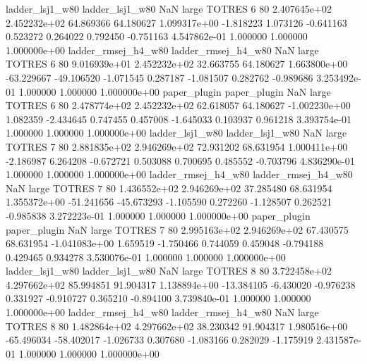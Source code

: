     ladder_lsj1_w80     ladder_lsj1_w80                   NaN      large   TOTRES                 6 80 2.407645e+02   2.452232e+02     64.869366      64.180627  1.099317e+00     -1.818223      1.073126    -0.641163       0.523272  0.264022   0.792450    -0.751163   4.547862e-01            1.000000        1.000000        1.000000e+00
ladder_rmsej_h4_w80 ladder_rmsej_h4_w80                   NaN      large   TOTRES                 6 80 9.016939e+01   2.452232e+02     32.663755      64.180627  1.663800e+00    -63.229667    -49.106520    -1.071545       0.287187 -1.081507   0.282762    -0.989686   3.253492e-01            1.000000        1.000000        1.000000e+00
       paper_plugin        paper_plugin                   NaN      large   TOTRES                 6 80 2.478774e+02   2.452232e+02     62.618057      64.180627 -1.002230e+00      1.082359     -2.434645     0.747455       0.457008 -1.645033   0.103937     0.961218   3.393754e-01            1.000000        1.000000        1.000000e+00
    ladder_lsj1_w80     ladder_lsj1_w80                   NaN      large   TOTRES                 7 80 2.881835e+02   2.946269e+02     72.931202      68.631954  1.000411e+00     -2.186987      6.264208    -0.672721       0.503088  0.700695   0.485552    -0.703796   4.836290e-01            1.000000        1.000000        1.000000e+00
ladder_rmsej_h4_w80 ladder_rmsej_h4_w80                   NaN      large   TOTRES                 7 80 1.436552e+02   2.946269e+02     37.285480      68.631954  1.355372e+00    -51.241656    -45.673293    -1.105590       0.272260 -1.128507   0.262521    -0.985838   3.272223e-01            1.000000        1.000000        1.000000e+00
       paper_plugin        paper_plugin                   NaN      large   TOTRES                 7 80 2.995163e+02   2.946269e+02     67.430575      68.631954 -1.041083e+00      1.659519     -1.750466     0.744059       0.459048 -0.794188   0.429465     0.934278   3.530076e-01            1.000000        1.000000        1.000000e+00
    ladder_lsj1_w80     ladder_lsj1_w80                   NaN      large   TOTRES                 8 80 3.722458e+02   4.297662e+02     85.994851      91.904317  1.138894e+00    -13.384105     -6.430020    -0.976238       0.331927 -0.910727   0.365210    -0.894100   3.739840e-01            1.000000        1.000000        1.000000e+00
ladder_rmsej_h4_w80 ladder_rmsej_h4_w80                   NaN      large   TOTRES                 8 80 1.482864e+02   4.297662e+02     38.230342      91.904317  1.980516e+00    -65.496034    -58.402017    -1.026733       0.307680 -1.083166   0.282029    -1.175919   2.431587e-01            1.000000        1.000000        1.000000e+00
